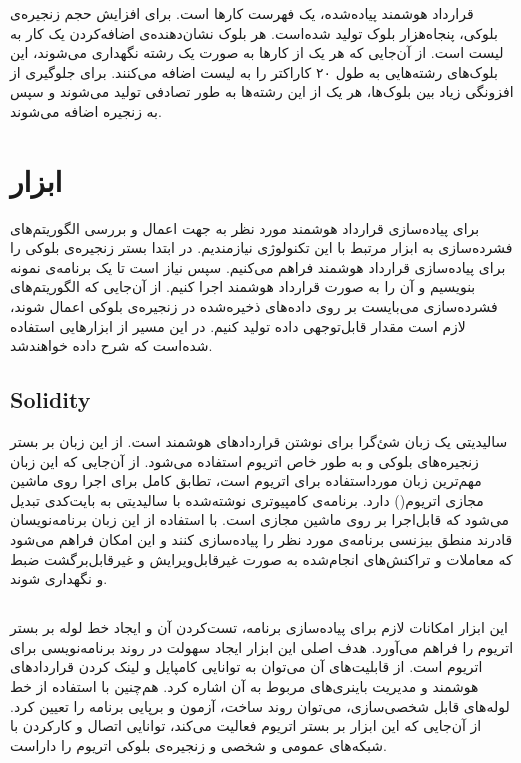 قرارداد هوشمند پیاده‌شده، یک فهرست کارها
است. برای افزایش حجم زنجیره‌ی بلوکی، پنجاه‌هزار بلوک تولید شده‌است. هر بلوک نشان‌دهنده‌ی اضافه‌کردن یک کار به لیست است. از آن‌جایی که هر یک از کارها به صورت یک رشته نگهداری می‌شوند، این بلوک‌های رشته‌هایی به طول ۲۰ کاراکتر را به لیست اضافه می‌کنند. برای جلوگیری از افزونگی زیاد بین بلوک‌ها، هر یک از این رشته‌ها به طور تصادفی تولید می‌شوند و سپس به زنجیره اضافه می‌شوند.

\section{ابزار}
برای پیاده‌سازی قرارداد هوشمند مورد نظر به جهت اعمال و بررسی الگوریتم‌های فشرده‌سازی به ابزار مرتبط با این تکنولوژی نیازمندیم. در ابتدا بستر زنجیره‌ی بلوکی را برای پیاده‌سازی قرارداد هوشمند فراهم می‌کنیم. سپس نیاز است تا یک برنامه‌ی نمونه بنویسیم و آن را به صورت قرارداد هوشمند اجرا کنیم. از آن‌جایی که الگوریتم‌های فشرده‌سازی می‌بایست بر روی داده‌های ذخیره‌شده در زنجیره‌ی بلوکی اعمال شوند، لازم است مقدار قابل‌توجهی داده تولید کنیم. در این مسیر از ابزارهایی استفاده شده‌است که شرح داده خواهندشد.

\subsection{Solidity}
سالیدیتی یک زبان شئ‌گرا برای نوشتن قراردادهای هوشمند است. از این زبان بر بستر زنجیره‌های بلوکی و به طور خاص اتریوم استفاده می‌شود. از آن‌جایی که این زبان مهم‌ترین زبان مورداستفاده برای اتریوم است، تطابق کامل برای اجرا روی ماشین مجازی اتریوم() دارد. برنامه‌ی کامپیوتری نوشته‌شده با سالیدیتی به بایت‌کدی تبدیل می‌شود که قابل‌اجرا بر روی ماشین مجازی است. با استفاده از این زبان برنامه‌نویسان قادرند منطق بیزنسی برنامه‌ی مورد نظر را پیاده‌سازی کنند و این امکان فراهم می‌شود که معاملات و تراکنش‌های انجام‌شده به صورت غیرقابل‌ویرایش و غیرقابل‌برگشت ضبط و نگهداری شوند. 

\subsection{}
این ابزار امکانات لازم برای پیاده‌سازی برنامه، تست‌کردن آن و ایجاد خط لوله
بر بستر اتریوم را فراهم می‌آورد. هدف اصلی این ابزار ایجاد سهولت در روند برنامه‌نویسی برای اتریوم است. از قابلیت‌های آن می‌توان به توانایی کامپایل و لینک کردن قراردادهای هوشمند و مدیریت باینری‌های مربوط به آن اشاره کرد. هم‌چنین با استفاده از خط لوله‌های قابل شخصی‌سازی، می‌توان روند ساخت، آزمون و برپایی برنامه را تعیین کرد. از آن‌جایی که این ابزار بر بستر اتریوم فعالیت می‌کند، توانایی اتصال و کارکردن با شبکه‌های عمومی و شخصی و زنجیره‌ی بلوکی اتریوم را داراست. 

